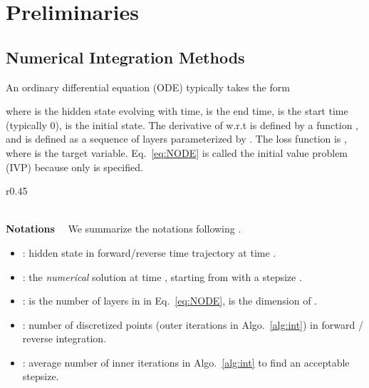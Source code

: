 \documentclass{article} \usepackage{iclr2021_conference,times}
\begin{document}
\section{Preliminaries}
\subsection{Numerical Integration Methods}
An ordinary differential equation (ODE) typically takes the form

where  is the hidden state evolving with time,  is the end time,  is the start time (typically 0),  is the initial state. The derivative of  w.r.t  is defined by a function , and  is defined as a sequence of layers parameterized by . The loss function is , where  is the target variable. Eq.~\ref{eq:NODE} is called the initial value problem (IVP) because only  is specified.
\begin{wrapfigure}{r}{0.45\textwidth}
\begin{minipage}{\linewidth}
\end{minipage}
\vspace{-4mm}
\end{wrapfigure} \\
\textbf{Notations} \ \ We summarize the notations following \citet{zhuang2020adaptive}.
\begin{itemize}[topsep=0pt,parsep=0pt,partopsep=0pt,leftmargin=*]
\item : hidden state in forward/reverse time trajectory at time .
\item : the \textit{numerical} solution at time , starting from  with a stepsize .
\item :  is the number of layers in  in Eq.~\ref{eq:NODE},  is the dimension of .
\item : number of discretized points (outer iterations in Algo.~\ref{alg:int}) in forward / reverse integration. \item : average number of inner iterations in Algo.~\ref{alg:int} to find an acceptable stepsize.
\end{itemize} 
\end{document}
